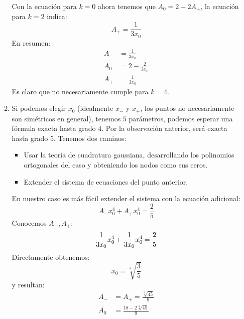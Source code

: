 \documentclass[english, spanish, fleqn]{article}
\begin{document}
\begin{enumerate}
\begin{enumerate}
      Con la ecuación para \(k = 0\) ahora tenemos que \(A_0 = 2 - 2 A_{+}\),
      la ecuación para \(k = 2\) indica:
      \begin{equation*}
        A_{+}
          = \frac{1}{3 x_0}
      \end{equation*}
      En resumen:
      \begin{align*}
        A_{-}
          &= \frac{1}{3 x_0} \\
        A_0
          &= 2 - \frac{2}{3 x_0} \\
        A_{+}
          &= \frac{1}{3 x_0}
      \end{align*}
      Es claro que no necesariamente cumple para \(k = 4\).
    \item %
      Si podemos elegir \(x_0\)
      (idealmente \(x_{-}\) y \(x_{+}\),
       los puntos no necesariamente son simétricos en general),
      tenemos \(5\) parámetros,
      podemos esperar una fórmula exacta hasta grado \(4\).
      Por la observación anterior,
      será exacta hasta grado \(5\).
      Tenemos dos caminos:
      \begin{itemize}
      \item
        Usar la teoría de cuadratura gaussiana,
        desarrollando los polinomios ortogonales del caso
        y obteniendo los nodos como sus ceros.
      \item 
        Extender el sistema de ecuaciones del punto anterior.
      \end{itemize}
      En nuestro caso es más fácil extender el sistema
      con la ecuación adicional:
      \begin{equation*}
        A_{-} x_0^4 + A_{+} x_0^4
          = \frac{2}{5}
      \end{equation*}
      Conocemos \(A_{-}, A_{+}\):
      \begin{equation*}
        \frac{1}{3 x_0} x_0^4 + \frac{1}{3 x_0} x_0^4
          = \frac{2}{5} \\
      \end{equation*}
      Directamente obtenemos:
      \begin{equation*}
        x_0
          = \sqrt[3]{\frac{3}{5}}
      \end{equation*}
      y resultan:
      \begin{align*}
        A_{-}
          &= A_{+}
           = \frac{\sqrt[3]{45}}{9} \\
        A_0
          &= \frac{18 - 2 \sqrt[3]{45}}{9}
      \end{align*}
    \end{enumerate}
    

\end{enumerate}
\end{document}
